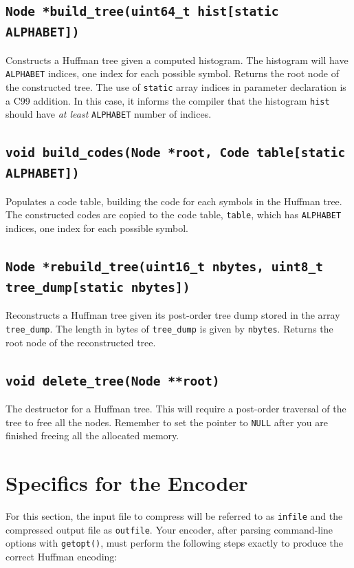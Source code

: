 \documentclass[11pt]{article}
\begin{document}
\subsection{\texttt{Node *build\_tree(uint64\_t hist[static ALPHABET])}}

Constructs a Huffman tree given a computed histogram. The histogram will
have \texttt{ALPHABET} indices, one index for each possible symbol.
Returns the root node of the constructed tree. The use of
\texttt{static} array indices in parameter declaration is a C99
addition. In this case, it informs the compiler that the histogram
\texttt{hist} should have \emph{at least} \texttt{ALPHABET} number of
indices.

\subsection{\texttt{void build\_codes(Node *root, Code
table[static ALPHABET])}}

Populates a code table, building the code for each symbols in the
Huffman tree. The constructed codes are copied to the code table,
\texttt{table}, which has \texttt{ALPHABET} indices, one index for each
possible symbol.

\subsection{\texttt{Node *rebuild\_tree(uint16\_t nbytes, uint8\_t
tree\_dump[static nbytes])}}

Reconstructs a Huffman tree given its post-order tree dump stored in the
array \texttt{tree\_dump}. The length in bytes of \texttt{tree\_dump} is
given by \texttt{nbytes}. Returns the root node of the reconstructed
tree.

\subsection{\texttt{void delete\_tree(Node **root)}}

The destructor for a Huffman tree. This will require a post-order
traversal of the tree to free all the nodes. Remember to set the pointer
to \texttt{NULL} after you are finished freeing all the allocated
memory.

\section{Specifics for the Encoder}

For this section, the input file to compress will be referred to as
\texttt{infile} and the compressed output file as \texttt{outfile}. Your
encoder, after parsing command-line options with \texttt{getopt()}, must
perform the following steps exactly to produce the correct Huffman
encoding:
\end{document}
